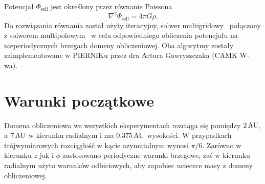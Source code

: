 \par Potencjał $\Phi_{\textrm{self}}$ jest określony przez równanie Poissona
\begin{equation}\label{eq:poisson}
   \nabla^2 \Phi_{\textrm{self}} = 4\pi G \rho.
\end{equation}
Do rozwiązania równania  został użyty iteracyjny, solwer
multigridowy~\citep{doi:10.1137/S1064827598346235} połączony z solwerem
multipolowym~\citep{1977JCoPh..25...71J} w celu odpowiedniego obliczenia
potencjału na nieperiodycznych brzegach domeny obliczeniowej. Oba algorytmy
zostały zaimplementowane w PIERNIKu przez dra Artura Gawryszczaka (CAMK W-wa).

\section{Warunki początkowe}
Domena obliczeniowa we wszystkich eksperymentach rozciąga się pomiędzy $2\hbox{$\thinspace\textrm{AU}$}$, a
$7\hbox{$\thinspace\textrm{AU}$}$ w kierunku radialnym i ma $0.375\hbox{$\thinspace\textrm{AU}$}$ wysokości. W przypadkach
trójwymiarowych rozciągłość w kącie azymutalnym wynosi $\pi / 6$.
Zarówno w kierunku $z$ jak i $\phi$ zastosowano periodyczne warunki brzegowe,
zaś w kierunku radialnym użyto warunków odbiciowych, aby zapobiec ucieczce masy
z domeny obliczeniowej.

